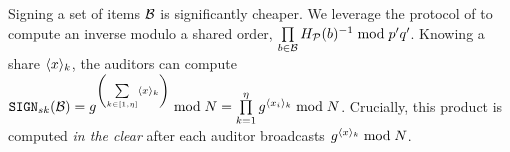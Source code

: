%
Signing a set of items $\blocklist$ is significantly cheaper.  We leverage the protocol of \citet[Fig. 3]{catalano2000computing} to compute an inverse modulo a shared order, $\prod\limits_{\genericBlocklistElmt \in \blocklist}\primeRO(\genericBlocklistElmt)^{-1} \bmod \sgPrime[1] \sgPrime[2]$. Knowing a share $\langle \genericSetElmt \rangle_{\auditorIdx}$, the auditors can compute $\sign[\privKey](\blocklist) = \qrGen^{\left(\sum\limits_{\auditorIdx \in [1, \numAuditors]}\langle \genericSetElmt \rangle_{\auditorIdx}\right)}\bmod \rsaMod = \prod\limits_{\auditorIdx = 1}^{\numAuditors} \qrGen^{\langle \genericSetElmt_{\setIdx} \rangle_{\auditorIdx}} \bmod \rsaMod$. Crucially, this product is computed \emph{in the clear} after each auditor broadcasts  $\qrGen^{\langle \genericSetElmt \rangle_{\auditorIdx}} \bmod \rsaMod$. 







\iffalse 

